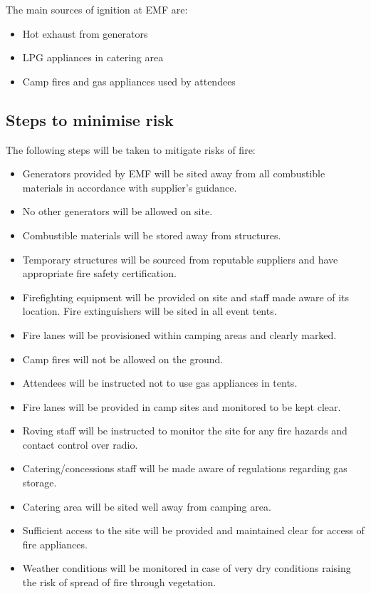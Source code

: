 The main sources of ignition at EMF are:

\begin{itemize}
\item Hot exhaust from generators
\item LPG appliances in catering area
\item Camp fires and gas appliances used by attendees
\end{itemize}

\subsection{Steps to minimise risk}
The following steps will be taken to mitigate risks of fire:

\begin{itemize}
\item Generators provided by EMF will be sited away from all combustible materials in accordance with supplier's guidance.
\item No other generators will be allowed on site.
\item Combustible materials will be stored away from structures.
\item Temporary structures will be sourced from reputable suppliers and have appropriate fire safety certification.
\item Firefighting equipment will be provided on site and staff made aware of its location. Fire extinguishers will be sited in all event tents.
\item Fire lanes will be provisioned within camping areas and clearly marked.
\item Camp fires will not be allowed on the ground.
\item Attendees will be instructed not to use gas appliances in tents.
\item Fire lanes will be provided in camp sites and monitored to be kept clear.
\item Roving staff will be instructed to monitor the site for any fire hazards and contact control over radio.
\item Catering/concessions staff will be made aware of regulations regarding gas storage.
\item Catering area will be sited well away from camping area.
\item Sufficient access to the site will be provided and maintained clear for access of fire appliances.
\item Weather conditions will be monitored in case of very dry conditions raising the risk of spread of fire through vegetation.
\end{itemize}

